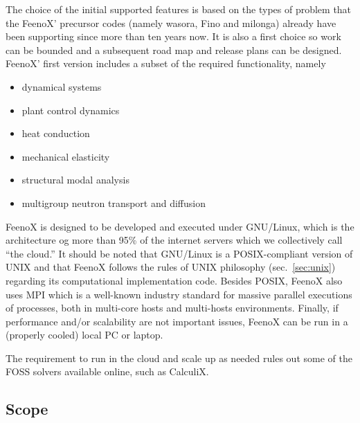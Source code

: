 \documentclass[
  american,
]{article}
\providecommand{\tightlist}{%
  \setlength{\itemsep}{0pt}\setlength{\parskip}{0pt}}
\begin{document}
The choice of the initial supported features is based on the types of
problem that the FeenoX' precursor codes (namely wasora, Fino and
milonga) already have been supporting since more than ten years now. It
is also a first choice so work can be bounded and a subsequent road map
and release plans can be designed. FeenoX' first version includes a
subset of the required functionality, namely

\begin{itemize}
\tightlist
\item
  dynamical systems
\item
  plant control dynamics
\item
  heat conduction
\item
  mechanical elasticity
\item
  structural modal analysis
\item
  multigroup neutron transport and diffusion
\end{itemize}

FeenoX is designed to be developed and executed under GNU/Linux, which
is the architecture og more than 95\% of the internet servers which we
collectively call ``the cloud.'' It should be noted that GNU/Linux is a
POSIX-compliant version of UNIX and that FeenoX follows the rules of
UNIX philosophy (sec.~\ref{sec:unix}) regarding its computational
implementation code. Besides POSIX, FeenoX also uses MPI which is a
well-known industry standard for massive parallel executions of
processes, both in multi-core hosts and multi-hosts environments.
Finally, if performance and/or scalability are not important issues,
FeenoX can be run in a (properly cooled) local PC or laptop.

The requirement to run in the cloud and scale up as needed rules out
some of the FOSS solvers available online, such as CalculiX.

\hypertarget{sec:scope}{%
\subsection{Scope}\label{sec:scope}}
\end{document}
